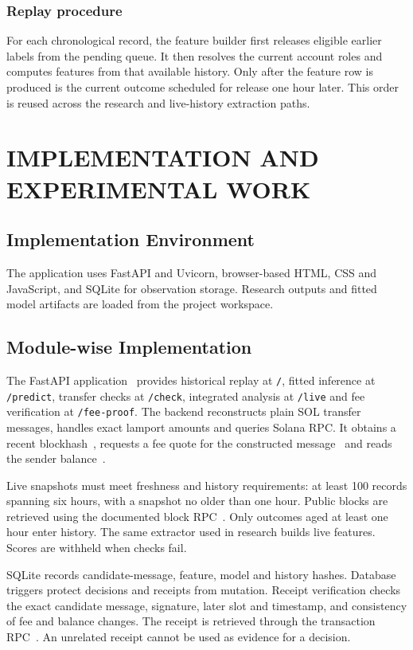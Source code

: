 \documentclass[12pt,a4paper,oneside]{report}
\begin{document}
\subsection{Replay procedure}
For each chronological record, the feature builder first releases eligible earlier labels from the pending queue. It then resolves the current account roles and computes features from that available history. Only after the feature row is produced is the current outcome scheduled for release one hour later. This order is reused across the research and live-history extraction paths.

\chapter{IMPLEMENTATION AND EXPERIMENTAL WORK}
\section{Implementation Environment}
The application uses FastAPI and Uvicorn, browser-based HTML, CSS and JavaScript, and SQLite for observation storage. Research outputs and fitted model artifacts are loaded from the project workspace.

\section{Module-wise Implementation}
The FastAPI application~\cite{fastapi} provides historical replay at \texttt{/}, fitted inference at \texttt{/predict}, transfer checks at \texttt{/check}, integrated analysis at \texttt{/live} and fee verification at \texttt{/fee-proof}. The backend reconstructs plain SOL transfer messages, handles exact lamport amounts and queries Solana RPC. It obtains a recent blockhash~\cite{blockhash}, requests a fee quote for the constructed message~\cite{feequote} and reads the sender balance~\cite{balance}.

Live snapshots must meet freshness and history requirements: at least 100 records spanning six hours, with a snapshot no older than one hour. Public blocks are retrieved using the documented block RPC~\cite{getblock}. Only outcomes aged at least one hour enter history. The same extractor used in research builds live features. Scores are withheld when checks fail.

SQLite records candidate-message, feature, model and history hashes. Database triggers protect decisions and receipts from mutation. Receipt verification checks the exact candidate message, signature, later slot and timestamp, and consistency of fee and balance changes. The receipt is retrieved through the transaction RPC~\cite{gettransaction}. An unrelated receipt cannot be used as evidence for a decision.
\end{document}
